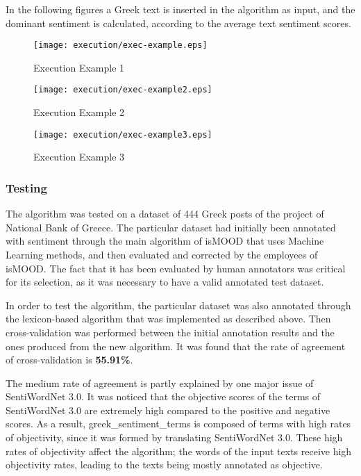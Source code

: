 In the following figures
a Greek text is inserted in the algorithm as input,
and the dominant sentiment is calculated,
according to the average text sentiment scores.

\begin{figure}[ht]
\centering
\texttt{[image: execution/exec-example.eps]}
\caption{Execution Example 1}
\label{fig:exec-example}
\end{figure}

\begin{figure}[ht]
\centering
\texttt{[image: execution/exec-example2.eps]}
\caption{Execution Example 2}
\label{fig:exec-example2}
\end{figure}

\begin{figure}[ht]
\centering
\texttt{[image: execution/exec-example3.eps]}
\caption{Execution Example 3}
\label{fig:exec-example3}
\end{figure}

\clearpage

\subsubsection{Testing}
\label{subsubsec:testing}

The algorithm was tested on a dataset of 444 Greek posts
of the project of National Bank of Greece.
The particular dataset had initially been annotated with sentiment
through the main algorithm of isMOOD that uses Machine Learning methods,
and then evaluated and corrected by the employees of isMOOD.
The fact that it has been evaluated by human annotators
was critical for its selection,
as it was necessary to have a valid annotated test dataset.

In order to test the algorithm,
the particular dataset was also annotated
through the lexicon-based algorithm that was implemented
as described above.
Then cross-validation was performed between
the initial annotation results
and the ones produced from the new algorithm.
It was found that the rate of agreement of cross-validation
is \textbf{55.91\%}.

The medium rate of agreement is partly explained
by one major issue of SentiWordNet 3.0.
It was noticed that the objective scores
of the terms of SentiWordNet 3.0 are extremely high
compared to the positive and negative scores.
As a result, greek\_sentiment\_terms is composed
of terms with high rates of objectivity,
since it was formed by translating SentiWordNet 3.0.
These high rates of objectivity affect the algorithm;
the words of the input texts receive high objectivity rates,
leading to the texts being mostly annotated as objective.

